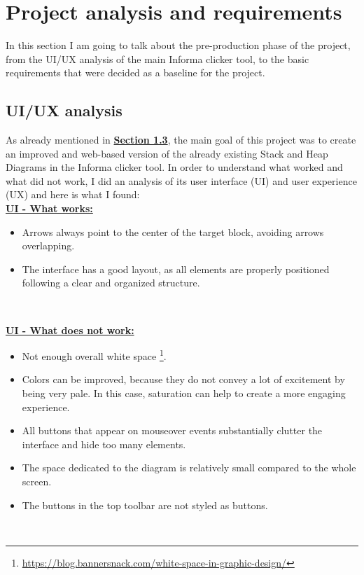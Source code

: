 \documentclass[]{usiinfbachelorproject}
\begin{document}
\vspace{\fill}
\pagebreak

\section{Project analysis and requirements} \label{requirements+analysis}

In this section I am going to talk about the pre-production phase of the project, from the UI/UX analysis of the main Informa clicker tool, to the basic requirements that were decided as a baseline for the project.

\subsection{UI/UX analysis}

As already mentioned in \hyperref[goal]{\textbf{Section 1.3}}, the main goal of this project was to create an improved and web-based version of the already existing Stack and Heap Diagrams in the Informa clicker tool. In order to understand what worked and what did not work, I did an analysis of its user interface (UI) and user experience (UX) and here is what I found:\\

\textbf{\ul{UI - What works:}}

\begin{itemize}
	\item Arrows always point to the center of the target block, avoiding arrows overlapping.
	\item The interface has a good layout, as all elements are properly positioned following a clear and organized structure.
\end{itemize}\

\textbf{\ul{UI - What does not work:}}

\begin{itemize}
	\item Not enough overall white space \footnote{\url{https://blog.bannersnack.com/white-space-in-graphic-design/}}.
	\item Colors can be improved, because they do not convey a lot of excitement by being very pale. In this case, saturation can help to create a more engaging experience.
	\item All buttons that appear on mouseover events substantially clutter the interface and hide too many elements.
	\item The space dedicated to the diagram is relatively small compared to the whole screen.
	\item The buttons in the top toolbar are not styled as buttons.
\end{itemize}\
\end{document}
